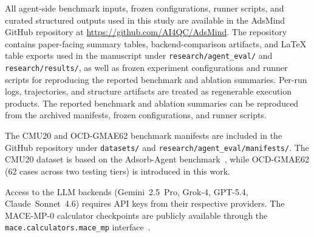 All agent-side benchmark inputs, frozen configurations, runner scripts, and curated structured outputs used in this study are available in the AdsMind GitHub repository at \url{https://github.com/AI4QC/AdsMind}. The repository contains paper-facing summary tables, backend-comparison artifacts, and LaTeX table exports used in the manuscript under \texttt{research/agent\_eval/} and \texttt{research/results/}, as well as frozen experiment configurations and runner scripts for reproducing the reported benchmark and ablation summaries. Per-run logs, trajectories, and structure artifacts are treated as regenerable execution products. The reported benchmark and ablation summaries can be reproduced from the archived manifests, frozen configurations, and runner scripts.

The CMU20 and OCD-GMAE62 benchmark manifests are included in the GitHub repository under \texttt{datasets/} and \texttt{research/agent\_eval/manifests/}. The CMU20 dataset is based on the Adsorb-Agent benchmark~\cite{ock2026adsorbagent}, while OCD-GMAE62 (62 cases across two testing tiers) is introduced in this work.

Access to the LLM backends (Gemini~2.5~Pro, Grok-4, GPT-5.4, Claude~Sonnet~4.6) requires API keys from their respective providers. The MACE-MP-0 calculator checkpoints are publicly available through the \texttt{mace.calculators.mace\_mp} interface~\cite{batatia2023foundation}.

